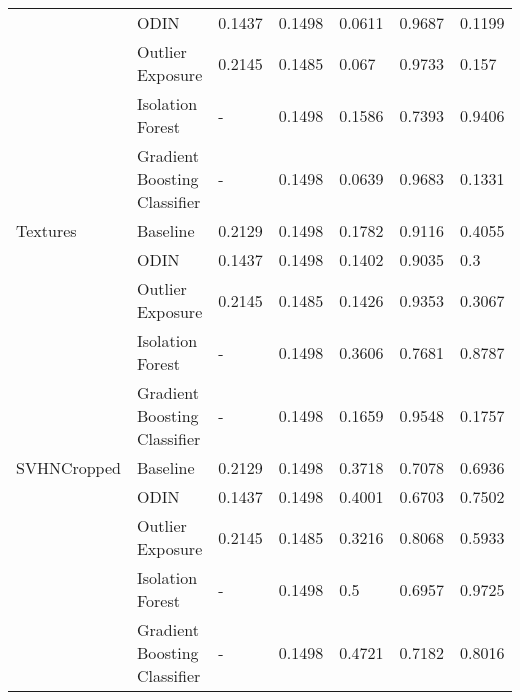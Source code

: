 \begin{tabular}{lllllll}
            & ODIN &        0.1437 &               0.1498 &    0.0611 &  0.9687 &         0.1199 \\
            & Outlier Exposure &        0.2145 &               0.1485 &     0.067 &  0.9733 &          0.157 \\
            & Isolation Forest &             - &               0.1498 &    0.1586 &  0.7393 &         0.9406 \\
            & Gradient Boosting Classifier &             - &               0.1498 &    0.0639 &  0.9683 &         0.1331 \\
Textures & Baseline &        0.2129 &               0.1498 &    0.1782 &  0.9116 &         0.4055 \\
            & ODIN &        0.1437 &               0.1498 &    0.1402 &  0.9035 &            0.3 \\
            & Outlier Exposure &        0.2145 &               0.1485 &    0.1426 &  0.9353 &         0.3067 \\
            & Isolation Forest &             - &               0.1498 &    0.3606 &  0.7681 &         0.8787 \\
            & Gradient Boosting Classifier &             - &               0.1498 &    0.1659 &  0.9548 &         0.1757 \\
SVHNCropped & Baseline &        0.2129 &               0.1498 &    0.3718 &  0.7078 &         0.6936 \\
            & ODIN &        0.1437 &               0.1498 &    0.4001 &  0.6703 &         0.7502 \\
            & Outlier Exposure &        0.2145 &               0.1485 &    0.3216 &  0.8068 &         0.5933 \\
            & Isolation Forest &             - &               0.1498 &       0.5 &  0.6957 &         0.9725 \\
            & Gradient Boosting Classifier &             - &               0.1498 &    0.4721 &  0.7182 &         0.8016 \\
\bottomrule
\end{tabular}
